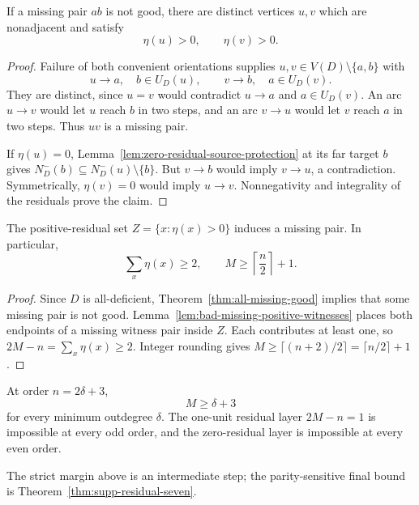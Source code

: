 \begin{lemma}\label{lem:bad-missing-positive-witnesses}
If a missing pair $ab$ is not good, there are distinct vertices
$u,v$ which are nonadjacent and satisfy
\[
 \eta(u)>0,\qquad \eta(v)>0.
\]
\end{lemma}
\begin{proof}
Failure of both convenient orientations supplies
$u,v\in V(D)\setminus\{a,b\}$ with
\[
 u\to a,\quad b\in U_D(u),\qquad
 v\to b,\quad a\in U_D(v).
\]
They are distinct, since $u=v$ would contradict $u\to a$ and
$a\in U_D(v)$. An arc $u\to v$ would let $u$ reach $b$ in
two steps, and an arc $v\to u$ would let $v$ reach $a$ in
two steps.  Thus $uv$ is a missing pair.

If $\eta(u)=0$, Lemma~\ref{lem:zero-residual-source-protection}
at its far target $b$ gives
$N_D^-(b)\subseteq N_D^-(u)\setminus\{b\}$.
But $v\to b$ would imply $v\to u$, a contradiction.
Symmetrically, $\eta(v)=0$ would imply $u\to v$.
Nonnegativity and integrality of the residuals prove the claim.
\end{proof}

\begin{theorem}
\label{thm:strict-missing-margin}
The positive-residual set $Z=\{x:\eta(x)>0\}$ induces a missing pair.
In particular,
\[
 {\sum_x\eta(x)\ge2,\qquad
 M\ge\left\lceil\frac n2\right\rceil+1.}
\]
\end{theorem}
\begin{proof}
Since $D$ is all-deficient, Theorem~\ref{thm:all-missing-good}
implies that some missing pair is not good.
Lemma~\ref{lem:bad-missing-positive-witnesses} places both endpoints
of a missing witness pair inside $Z$.
Each contributes at least one, so $2M-n=\sum_x\eta(x)\ge2$.
Integer rounding gives $M\ge\lceil(n+2)/2\rceil
=\lceil n/2\rceil+1$.
\end{proof}

\begin{corollary}\label{cor:strict-first-dense-layer}
At order $n=2\delta+3$,
\[
 {M\ge\delta+3}
\]
for every minimum outdegree $\delta$.
The one-unit residual layer $2M-n=1$ is impossible at every odd order,
and the zero-residual layer is impossible at every even order.
\end{corollary}


The strict margin above is an intermediate step; the parity-sensitive final bound is Theorem~\ref{thm:supp-residual-seven}.
